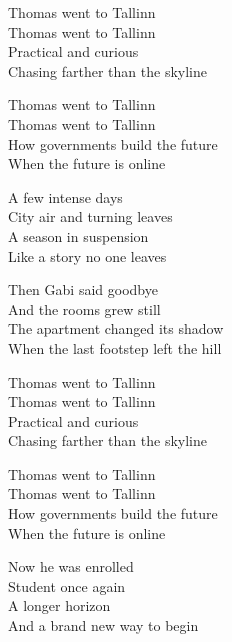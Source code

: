 \begin{lyrics}
Thomas went to Tallinn\\
Thomas went to Tallinn\\
Practical and curious\\
Chasing farther than the skyline

Thomas went to Tallinn\\
Thomas went to Tallinn\\
How governments build the future\\
When the future is online

A few intense days\\
City air and turning leaves\\
A season in suspension\\
Like a story no one leaves

Then Gabi said goodbye\\
And the rooms grew still\\
The apartment changed its shadow\\
When the last footstep left the hill

Thomas went to Tallinn\\
Thomas went to Tallinn\\
Practical and curious\\
Chasing farther than the skyline

Thomas went to Tallinn\\
Thomas went to Tallinn\\
How governments build the future\\
When the future is online

Now he was enrolled\\
Student once again\\
A longer horizon\\
And a brand new way to begin
\end{lyrics}

